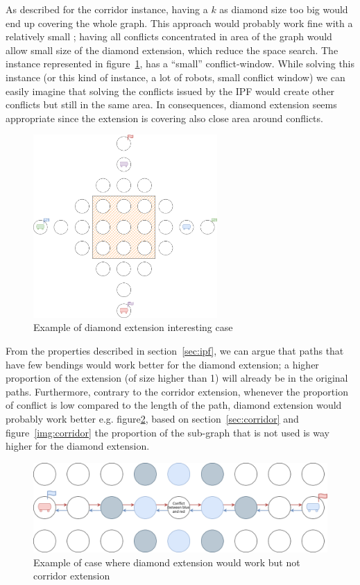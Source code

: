 As described for the corridor instance, having a \(k\) as diamond size too big would end up covering the whole graph. This approach would probably work fine with a relatively small ; having all conflicts concentrated in area of the graph would allow small size of the diamond extension, which reduce the space search. The instance represented in figure~\ref{img:diamond_case}, has a ``small'' conflict-window. While solving this instance (or this kind of instance, a lot of robots, small conflict window) we can easily imagine that solving the conflicts issued by the IPF would create other conflicts but still in the same area. In consequences, diamond extension seems appropriate since the extension is covering also close area around conflicts. 
\begin{figure}[H]
  \centering
  \caption{Example of diamond extension interesting case }\label{img:diamond_case}
  \includegraphics[width=7cm]{img/diamond_extension_case_example.drawio.png}
\end{figure}

From the properties described in section~\ref{sec:ipf}, we can argue that paths that have few bendings would work better for the diamond extension; a higher proportion of the extension (of size higher than 1) will already be in the original paths. Furthermore, contrary to the corridor extension, whenever the proportion of conflict is low compared to the length of the path, diamond extension would probably work better e.g. figure\ref{img:diamond_vs_corridor}, based on section~\ref{sec:corridor} and figure~\ref{img:corridor} the proportion of the sub-graph that is not used is way higher for the diamond extension.

\begin{figure}[H]
  \centering
  \caption{Example of case where diamond extension would work but not corridor extension}\label{img:diamond_vs_corridor}
  \includegraphics[width=\widthimg]{img/diamond_vs_corridor.drawio.png}
\end{figure}





